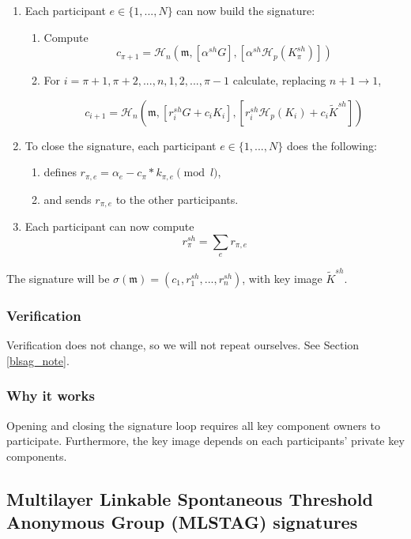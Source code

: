 \begin{enumerate}
	\item Each participant $e \in \{1,...,N\}$ can now build the signature:
	\begin{enumerate}
	    \item Compute
    	\[c_{\pi+1} = \mathcal{H}_n(\mathfrak{m}, [\alpha^{sh} G], [\alpha^{sh} \mathcal{H}_p(K^{sh}_\pi)])\]
    	\item For \(i = \pi+1, \pi+2, ..., n, 1, 2, ..., \pi-1\) calculate, replacing \(n + 1 \rightarrow 1\),
    	
    	\[  c_{i+1} = \mathcal{H}_n(\mathfrak{m}, [r^{sh}_i G + c_i K_i], [r^{sh}_i \mathcal{H}_p(K_i) + c_i \tilde{K}^{sh}])  \]
	\end{enumerate}
	
	\item To close the signature, each participant $e \in \{1,...,N\}$ does the following:
	\begin{enumerate}
	    \item defines \(r_{\pi,e} = \alpha_e - c_\pi*k_{\pi,e} \pmod l\),
	    \item and sends $r_{\pi,e}$ to the other participants.
	\end{enumerate}
	
	\item Each participant can now compute
	\[ r^{sh}_\pi = \sum_e r_{\pi,e} \]
\end{enumerate}

The signature will be \(\sigma(\mathfrak{m}) = (c_1, r^{sh}_1, ..., r^{sh}_n) \), with key image $\tilde{K}^{sh}$.

\subsubsection*{Verification}

Verification does not change, so we will not repeat ourselves. See Section \ref{blsag_note}.

\subsubsection*{Why it works}

Opening and closing the signature loop requires all key component owners to participate. Furthermore, the key image depends on each participants' private key components.


\subsection{Multilayer Linkable Spontaneous Threshold Anonymous Group (MLSTAG) signatures}
\label{sec:MLSTAG}


